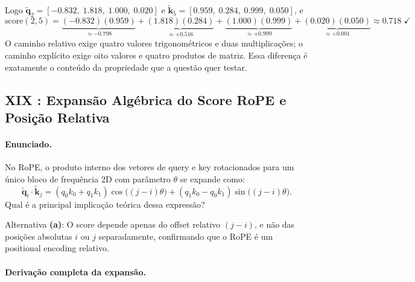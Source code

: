\documentclass{dlproblemset}
\begin{document}
Logo $\tilde{\mathbf{q}}_2 = [-0.832,\; 1.818,\; 1.000,\; 0.020]$ e
$\tilde{\mathbf{k}}_5 = [0.959,\; 0.284,\; 0.999,\; 0.050]$, e
\[
  \mathrm{score}(2,5)
  = \underbrace{(-0.832)(0.959)}_{\approx -0.798}
  + \underbrace{(1.818)(0.284)}_{\approx +0.516}
  + \underbrace{(1.000)(0.999)}_{\approx +0.999}
  + \underbrace{(0.020)(0.050)}_{\approx +0.001}
  \approx 0.718 \;\checkmark
\]
O caminho relativo exige quatro valores trigonométricos e duas multiplicações; o
caminho explícito exige oito valores e quatro produtos de matriz. Essa diferença é
exatamente o conteúdo da propriedade que a questão quer testar.
\subsection*{XIX {\mdseries{}}: Expansão Algébrica do Score RoPE e Posição Relativa}

\paragraph{Enunciado.}
No RoPE, o produto interno dos vetores de query e key rotacionados para um único
bloco de frequência 2D com parâmetro $\theta$ se expande como:
\[
  \tilde{\mathbf{q}}_i \cdot \tilde{\mathbf{k}}_j
  = (q_0 k_0 + q_1 k_1)\cos\!\bigl((j-i)\theta\bigr)
    + (q_1 k_0 - q_0 k_1)\sin\!\bigl((j-i)\theta\bigr).
\]
Qual é a principal implicação teórica dessa expressão?

\begin{respostabox}
Alternativa \textbf{(a)}: O score depende apenas do offset relativo $(j-i)$, e não das
posições absolutas $i$ ou $j$ separadamente, confirmando que o RoPE é um positional
encoding relativo.
\end{respostabox}

\paragraph{Derivação completa da expansão.}
\end{document}
